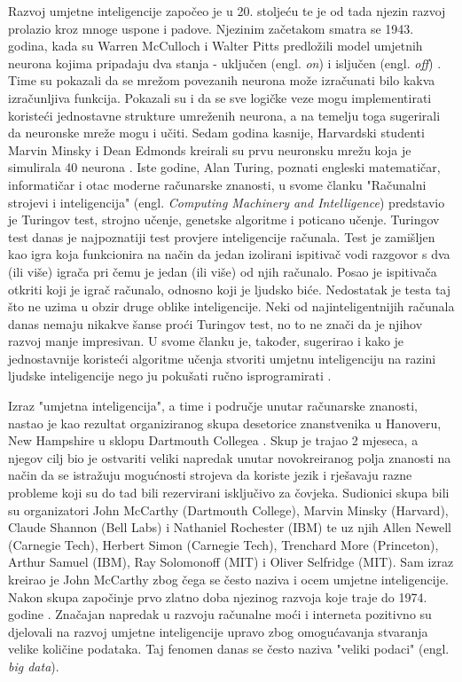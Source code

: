 \documentclass[]{foi} %
\begin{document}
Razvoj umjetne inteligencije započeo je u 20. stoljeću te je od tada njezin razvoj prolazio kroz mnoge uspone i padove. Njezinim začetakom smatra se 1943. godina, kada su Warren McCulloch i Walter Pitts predložili model umjetnih neurona kojima pripadaju dva stanja - uključen (engl. \textit{on}) i isljučen (engl. \textit{off}) \cite[str. 35]{AIModernApproach}. Time su pokazali da se mrežom povezanih neurona može izračunati bilo kakva izračunljiva funkcija. Pokazali su i da se sve logičke veze mogu implementirati koristeći jednostavne strukture umreženih neurona, a na temelju toga sugerirali da neuronske mreže mogu i učiti. Sedam godina kasnije, Harvardski studenti Marvin Minsky i Dean Edmonds kreirali su prvu neuronsku mrežu koja je simulirala 40 neurona \cite[str. 35]{AIModernApproach}. Iste godine, Alan Turing, poznati engleski matematičar, informatičar i otac moderne računarske znanosti, u svome članku "Računalni strojevi i inteligencija" (engl. \textit{Computing Machinery and Intelligence}) \cite{turing} predstavio je Turingov test, strojno učenje, genetske algoritme i poticano učenje. Turingov test danas je najpoznatiji test provjere inteligencije računala. Test je zamišljen kao igra koja funkcionira na način da jedan izolirani ispitivač vodi razgovor s dva (ili više) igrača pri čemu je jedan (ili više) od njih računalo. Posao je ispitivača otkriti koji je igrač računalo, odnosno koji je ljudsko biće. Nedostatak je testa taj što ne uzima u obzir druge oblike inteligencije. Neki od najinteligentnijih računala danas nemaju nikakve šanse proći Turingov test, no to ne znači da je njihov razvoj manje impresivan. U svome članku je, također, sugerirao i kako je jednostavnije koristeći algoritme učenja stvoriti umjetnu inteligenciju na razini ljudske inteligencije nego ju pokušati ručno isprogramirati \cite{turing}.

Izraz "umjetna inteligencija", a time i područje unutar računarske znanosti, nastao je kao rezultat organiziranog skupa desetorice znanstvenika u Hanoveru, New Hampshire u sklopu Dartmouth Collegea \cite{proposal}. Skup je trajao 2 mjeseca, a njegov cilj bio je ostvariti veliki napredak unutar novokreiranog polja znanosti na način da se istražuju mogućnosti strojeva da koriste jezik i rješavaju razne probleme koji su do tad bili rezervirani isključivo za čovjeka. Sudionici skupa bili su organizatori John McCarthy (Dartmouth College), Marvin Minsky (Harvard), Claude Shannon (Bell Labs) i Nathaniel Rochester (IBM) te uz njih Allen Newell (Carnegie Tech), Herbert Simon (Carnegie Tech), Trenchard More (Princeton), Arthur Samuel (IBM), Ray Solomonoff (MIT) i Oliver Selfridge (MIT). Sam izraz kreirao je John McCarthy zbog čega se često naziva i ocem umjetne inteligencije. Nakon skupa započinje prvo zlatno doba njezinog razvoja koje traje do 1974. godine \cite{povijestAI}. Značajan napredak u razvoju računalne moći i interneta pozitivno su djelovali na razvoj umjetne inteligencije upravo zbog omogućavanja stvaranja velike količine podataka. Taj fenomen danas se često naziva "veliki podaci" (engl. \textit{big data}).
\end{document}
